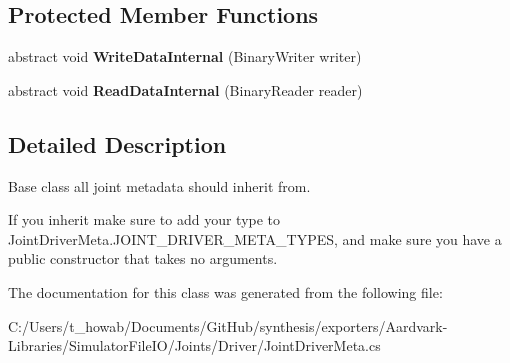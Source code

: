 \subsection*{Protected Member Functions}
\begin{DoxyCompactItemize}
\item 
\mbox{\label{class_joint_driver_meta_adf4e26898611dfdce9cd65190100b4f5}} 
abstract void {\bfseries Write\+Data\+Internal} (Binary\+Writer writer)
\item 
\mbox{\label{class_joint_driver_meta_a3f0af9deabeff7ea433a7e43689ddfa6}} 
abstract void {\bfseries Read\+Data\+Internal} (Binary\+Reader reader)
\end{DoxyCompactItemize}


\subsection{Detailed Description}
Base class all joint metadata should inherit from. 

If you inherit make sure to add your type to Joint\+Driver\+Meta.\+J\+O\+I\+N\+T\+\_\+\+D\+R\+I\+V\+E\+R\+\_\+\+M\+E\+T\+A\+\_\+\+T\+Y\+P\+ES, and make sure you have a public constructor that takes no arguments. 

The documentation for this class was generated from the following file\+:\begin{DoxyCompactItemize}
\item 
C\+:/\+Users/t\+\_\+howab/\+Documents/\+Git\+Hub/synthesis/exporters/\+Aardvark-\/\+Libraries/\+Simulator\+File\+I\+O/\+Joints/\+Driver/Joint\+Driver\+Meta.\+cs\end{DoxyCompactItemize}
